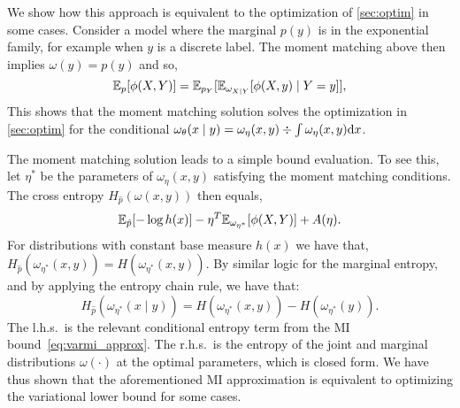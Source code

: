 We show how this approach is equivalent to the optimization
of \SEC\ref{sec:optim} in some cases.  Consider a model where the
marginal $p(y)$ is in the exponential family, for example when $y$ is
a discrete label.  The moment matching above then implies $\omega(y) =
p(y)$ and so,
\begin{equation}\label{eq:moment_match_cond}
  \mathbb{E}_p[ \phi(X,Y) ] = \mathbb{E}_{p_Y}[ \mathbb{E}_{\omega_{X\mid Y}}[ \phi(X,y)
      \mid Y=y ] ],
\end{equation}
This shows that the moment matching solution solves the optimization
in \SEC\ref{sec:optim} for the
conditional \mbox{$\omega_{\theta}(x\mid y)
= \omega_{\eta}(x,y) \div \int \omega_{\eta}(x,y) \mathrm{d} x$}.

The moment matching solution leads to a simple bound evaluation.  To
see this, let $\eta^*$ be the parameters of $\omega_{\eta}(x,y)$
satisfying the moment matching conditions.  The cross entropy
$H_{\hat{p}}(\omega(x,y))$ then equals,
\begin{equation}
  \mathbb{E}_{\hat{p}}[ - \log h(x) ] - \eta^T \mathbb{E}_{\omega_{\eta^*}}[ \phi(X,Y) ] + A(\eta).
\end{equation}
For distributions with constant base measure $h(x)$ we have that,
$H_{\hat{p}}(\omega_{\eta^*}(x,y)) = H(\omega_{\eta^*}(x,y))$.  By
similar logic for the marginal entropy, and by applying the entropy
chain rule, we have that:
\begin{equation}
  H_{\hat{p}}( \omega_{\eta^*}(x\mid y) ) = H(\omega_{\eta^*}(x,y)) - H(\omega_{\eta^*}(y)).
\end{equation}
The l.h.s.~is the relevant conditional entropy term from the MI
bound~\eqref{eq:varmi_approx}.  The r.h.s.~is the entropy of the joint
and marginal distributions $\omega(\cdot)$ at the optimal parameters,
which is closed form.  We have thus shown that the aforementioned MI
approximation is equivalent to optimizing the variational lower bound
for some cases.


